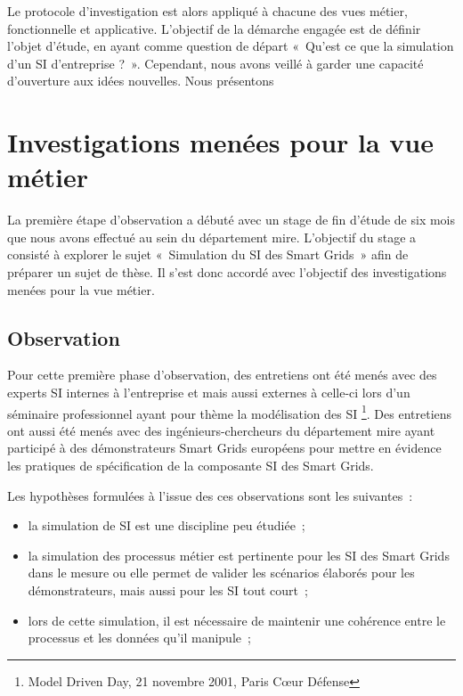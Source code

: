 	Le protocole d'investigation est alors appliqué à chacune des vues métier, 
fonctionnelle et applicative. L'objectif de la démarche engagée est de définir 
l'objet d'étude, en ayant comme question de départ «~Qu'est ce que la simulation 
d'un SI d'entreprise ?~». Cependant, nous avons veillé à garder une capacité 
d'ouverture aux idées nouvelles. Nous présentons
	
		\section{Investigations menées pour la vue métier}
			La première étape d'observation a débuté avec un stage de fin d'étude de six 
mois que nous avons effectué au sein du département \gls{mire}. L'objectif du 
stage a consisté à explorer le sujet «~Simulation du SI des Smart Grids~» afin 
de préparer un sujet de thèse. Il s'est donc accordé avec l'objectif des 
investigations menées pour la vue métier.
			
			\subsection{Observation}
				Pour cette première phase d'observation, des entretiens ont été menés avec 
des experts SI internes à l'entreprise et mais aussi externes à celle-ci lors 
d'un séminaire professionnel ayant pour thème la modélisation des SI \footnote{Model Driven Day, 21 novembre 2001, Paris 
Cœur Défense}. Des entretiens ont aussi été menés avec des ingénieurs-chercheurs 
du département \gls{mire} ayant participé à des démonstrateurs Smart Grids 
européens pour mettre en évidence les pratiques de spécification de la 
composante SI des Smart Grids. 

				Les hypothèses formulées à l'issue des ces observations sont les suivantes~:
				\begin{itemize}
					\item la simulation de SI est une discipline peu étudiée~;
					\item la simulation des processus métier est pertinente pour les SI des 
Smart Grids dans le mesure ou elle permet de valider les scénarios élaborés pour 
les démonstrateurs, mais aussi pour les SI tout court~;
					\item lors de cette simulation, il est nécessaire de maintenir une 
cohérence entre le processus et les données qu'il manipule~;
				\end{itemize}
		

